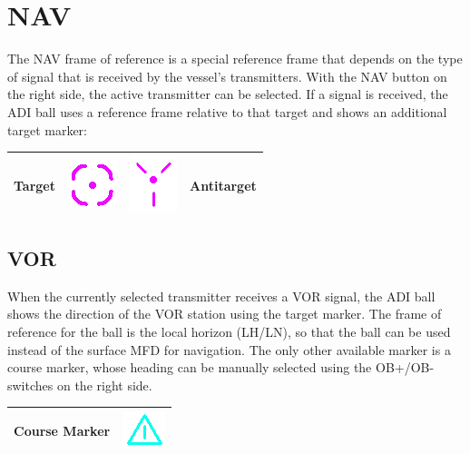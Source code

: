 \documentclass[paper=a4, 11 pt]{report}
\begin{document}
\section{NAV}
The NAV frame of reference is a special reference frame that depends on the type of signal that is received by the vessel's transmitters.
With the NAV button on the right side, the active transmitter can be selected.
If a signal is received, the ADI ball uses a reference frame relative to that target and shows an additional target marker:

\renewcommand{\arraystretch}{2.7}
\begin{center}
\begin{tabular}{ |c  c | c  c| }
  \hline
  Target & \includegraphics[scale=.5]{tgt.png} & \includegraphics[scale=.5]{tgt_2.png} & Antitarget \\ \hline
\end{tabular}
\end{center}


\subsection{VOR}
When the currently selected transmitter receives a VOR signal, the ADI ball shows the direction of the VOR station using the target marker.
The frame of reference for the ball is the local horizon (LH/LN), so that the ball can be used instead of the surface MFD for navigation.
The only other available marker is a course marker, whose heading can be manually selected using the OB+/OB- switches on the right side.

\renewcommand{\arraystretch}{2.7}
\begin{center}
\begin{tabular}{ |c  c | }
  \hline
  Course Marker & \includegraphics[scale=.5]{crs.png} \\ \hline
\end{tabular}
\end{center}
\end{document}
